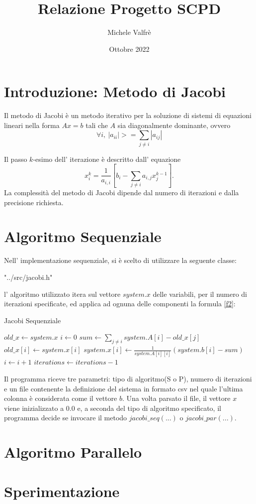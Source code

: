 \documentclass[twocolumn]{article}
\title{Relazione Progetto SCPD}
\date{Ottobre 2022}
\author{Michele Valfrè}
\begin{document}
	\maketitle
	\section{Introduzione: Metodo di Jacobi}
	Il metodo di Jacobi è un metodo iterativo per la soluzione di sistemi di equazioni lineari nella forma $Ax=b$ tali che $A$ sia diagonalmente dominante, ovvero
	\begin{equation}\label{f1}
		\forall i,\ |a_{ii}| >= \sum_{j \neq i} |a_{ij}| 
	\end{equation}
	
	Il passo $k$-esimo dell' iterazione è descritto dall' equazione
	\begin{equation}\label{f2}
		x^{k}_i = \frac{1}{a_{i,i}}[b_i  - \sum_{j\neq i}a_{i,j}x^{k-1}_j].
	\end{equation}
	La complessità del metodo di Jacobi dipende dal numero di iterazioni e dalla precisione richiesta.
	\section{Algoritmo Sequenziale}
	Nell' implementazione sequenziale, si è scelto di utilizzare la seguente classe:
	
						  {"../src/jacobi.h"}
	
	l' algoritmo utilizzato itera sul vettore $system.x$ delle variabili, per il numero di iterazioni specificate, ed applica ad ognuna delle componenti la formula \eqref{f2}:
	
	\begin{algorithm}
		\footnotesize
		\caption{Jacobi Sequenziale}
		\begin{algorithmic}[1]
				\State $old\_x \gets system.x$
				\State $i \gets 0$
				\State $sum \gets \sum_{j\neq i} system.A[i] - old\_x[j]$%
				\State $old\_x[i] \gets system.x[i]$
				\State $system.x[i] \gets \frac{1}{system.A[i][i]}(system.b[i] - sum)$
				\State $i \gets i + 1$
				\EndWhile
				\State $iterations \gets iterations - 1$
				\EndWhile
			\EndFunction
		\end{algorithmic}
	\end{algorithm}
	\pagebreak
	Il programma riceve tre parametri: tipo di algoritmo(S o P), numero di iterazioni e un file contenente la definizione del sistema in formato csv nel quale l'ultima colonna è considerata come il vettore $b$. Una volta parsato il file, il vettore $x$ viene inizializzato a $0.0$ e, a seconda del tipo di algoritmo specificato, il programma decide se invocare il metodo $jacobi\_seq(...)$ o $jacobi\_par(...)$.
	\section{Algoritmo Parallelo}
	
	\section{Sperimentazione}
	
\end{document}
